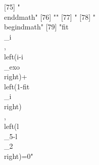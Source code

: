  [75] "\\end{dmath}"                                                                                                                                                                                                                                                                                                                                                                                                                                                                                
 [76] ""                                                                                                                                                                                                                                                                                                                                                                                                                                                                                            
 [77] "%
 [78] "\\begin{dmath}"                                                                                                                                                                                                                                                                                                                                                                                                                                                                              
 [79] "{{fit\\_i}}\\, \\left({i}-{{i\\_exo}}\\right)+\\left(1-{{fit\\_i}}\\right)\\, \\left({{l\\_5}}-{{l\\_2}}\\right)=0"                                                                                                                                                                                                                                                                                                                                                                          
